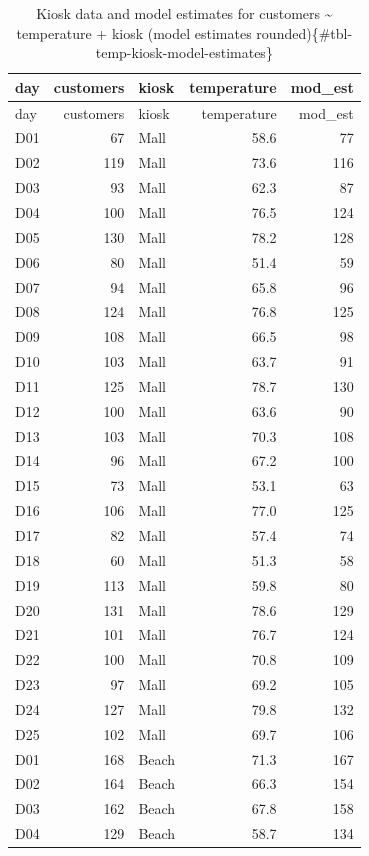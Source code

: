 \documentclass[
  12pt,
  letterpaper,
  DIV=11,
  numbers=noendperiod]{scrreprt}
\begin{document}
\begin{longtable}[]{@{}lrlrr@{}}
\caption{Kiosk data and model estimates for customers \textasciitilde{}
temperature + kiosk (model estimates
rounded)\{\#tbl-temp-kiosk-model-estimates\}}\tabularnewline
\toprule\noalign{}
day & customers & kiosk & temperature & mod\_est \\
\midrule\noalign{}
\endfirsthead
\toprule\noalign{}
day & customers & kiosk & temperature & mod\_est \\
\midrule\noalign{}
\endhead
\bottomrule\noalign{}
\endlastfoot
D01 & 67 & Mall & 58.6 & 77 \\
D02 & 119 & Mall & 73.6 & 116 \\
D03 & 93 & Mall & 62.3 & 87 \\
D04 & 100 & Mall & 76.5 & 124 \\
D05 & 130 & Mall & 78.2 & 128 \\
D06 & 80 & Mall & 51.4 & 59 \\
D07 & 94 & Mall & 65.8 & 96 \\
D08 & 124 & Mall & 76.8 & 125 \\
D09 & 108 & Mall & 66.5 & 98 \\
D10 & 103 & Mall & 63.7 & 91 \\
D11 & 125 & Mall & 78.7 & 130 \\
D12 & 100 & Mall & 63.6 & 90 \\
D13 & 103 & Mall & 70.3 & 108 \\
D14 & 96 & Mall & 67.2 & 100 \\
D15 & 73 & Mall & 53.1 & 63 \\
D16 & 106 & Mall & 77.0 & 125 \\
D17 & 82 & Mall & 57.4 & 74 \\
D18 & 60 & Mall & 51.3 & 58 \\
D19 & 113 & Mall & 59.8 & 80 \\
D20 & 131 & Mall & 78.6 & 129 \\
D21 & 101 & Mall & 76.7 & 124 \\
D22 & 100 & Mall & 70.8 & 109 \\
D23 & 97 & Mall & 69.2 & 105 \\
D24 & 127 & Mall & 79.8 & 132 \\
D25 & 102 & Mall & 69.7 & 106 \\
D01 & 168 & Beach & 71.3 & 167 \\
D02 & 164 & Beach & 66.3 & 154 \\
D03 & 162 & Beach & 67.8 & 158 \\
D04 & 129 & Beach & 58.7 & 134 \\

\end{longtable}
\end{document}

